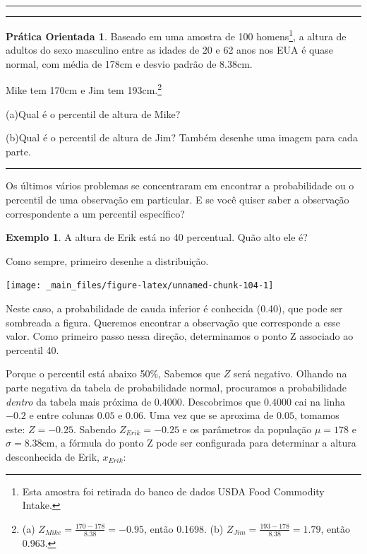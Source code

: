 \documentclass[
]{book}
\theoremstyle{definition}
\theoremstyle{definition}
\newtheorem{example}{Exemplo}[chapter]
\theoremstyle{definition}
\newtheorem{exercise}{Prática Orientada}[chapter]
\theoremstyle{definition}
\theoremstyle{remark}
\begin{document}
\begin{center}\rule{0.5\linewidth}{0.5pt}\end{center}

\begin{center}\rule{0.5\linewidth}{0.5pt}\end{center}

\begin{exercise}
\protect\hypertarget{exr:unnamed-chunk-102}{}{\label{exr:unnamed-chunk-102} }
Baseado em uma amostra de 100 homens\footnote{Esta amostra foi retirada do banco de dados USDA Food Commodity Intake.}, a altura de adultos do sexo masculino entre as idades de 20 e 62 anos nos EUA é quase normal, com média de 178cm e desvio padrão de 8.38cm.

Mike tem 170cm e Jim tem 193cm.\footnote{(a) \(Z_{Mike} = \frac{170 - 178}{8.38} = -0.95\), então 0.1698. (b) \(Z_{Jim} = \frac{193 - 178}{8.38} = 1.79\), então 0.963.}

(a)Qual é o percentil de altura de Mike?

(b)Qual é o percentil de altura de Jim? Também desenhe uma imagem para cada parte.
\end{exercise}

\begin{center}\rule{0.5\linewidth}{0.5pt}\end{center}

Os últimos vários problemas se concentraram em encontrar a probabilidade ou o percentil de uma observação em particular. E se você quiser saber a observação correspondente a um percentil específico?

\begin{example}
\protect\hypertarget{exm:unnamed-chunk-103}{}{\label{exm:unnamed-chunk-103} }A altura de Erik está no 40 percentual. Quão alto ele é?
\end{example}

Como sempre, primeiro desenhe a distribuição.

\texttt{[image: \_main\_files/figure-latex/unnamed-chunk-104-1]}

Neste caso, a probabilidade de cauda inferior é conhecida (0.40), que pode ser sombreada a figura. Queremos encontrar a observação que corresponde a esse valor. Como primeiro passo nessa direção, determinamos o ponto Z associado ao percentil 40.

Porque o percentil está abaixo 50\%, Sabemos que \(Z\) será negativo. Olhando na parte negativa da tabela de probabilidade normal, procuramos a probabilidade \emph{dentro} da tabela mais próxima de 0.4000. Descobrimos que 0.4000 cai na linha \(-0.2\) e entre colunas \(0.05\) e \(0.06\). Uma vez que se aproxima de \(0.05\), tomamos este: \(Z = -0.25\). Sabendo \(Z_{Erik}=-0.25\) e os parâmetros da população \(\mu= 178\) e \(\sigma= 8.38\)cm, a fórmula do ponto Z pode ser configurada para determinar a altura desconhecida de Erik, \(x_{Erik}\):
\end{document}
